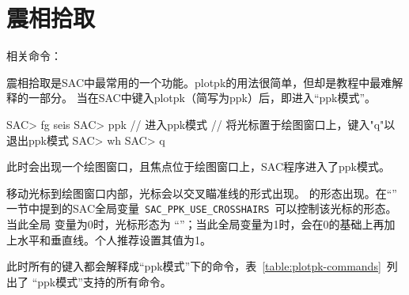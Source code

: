\section{震相拾取}
\label{sec:phase-picking}

相关命令：

震相拾取是SAC中最常用的一个功能。plotpk的用法很简单，但却是教程中最难解释的一部分。
当在SAC中键入plotpk（简写为ppk）后，即进入``ppk模式''。

\begin{SACCode}
SAC> fg seis
SAC> ppk        // 进入ppk模式
// 将光标置于绘图窗口上，键入"q"以退出ppk模式
SAC> wh
SAC> q
\end{SACCode}
此时会出现一个绘图窗口，且焦点位于绘图窗口上，SAC程序进入了ppk模式。

移动光标到绘图窗口内部，光标会以交叉瞄准线的形式出现。
的形态出现。在``''
一节中提到的SAC全局变量~\lstinline{SAC_PPK_USE_CROSSHAIRS}~可以控制该光标的形态。当此全局
变量为0时，光标形态为
``''；当此全局变量为1时，会在0的基础上再加上水平和垂直线。个人推荐设置其值为1。

此时所有的键入都会解释成``ppk模式''下的命令，表~\ref{table:plotpk-commands}~列出了
``ppk模式''支持的所有命令。

